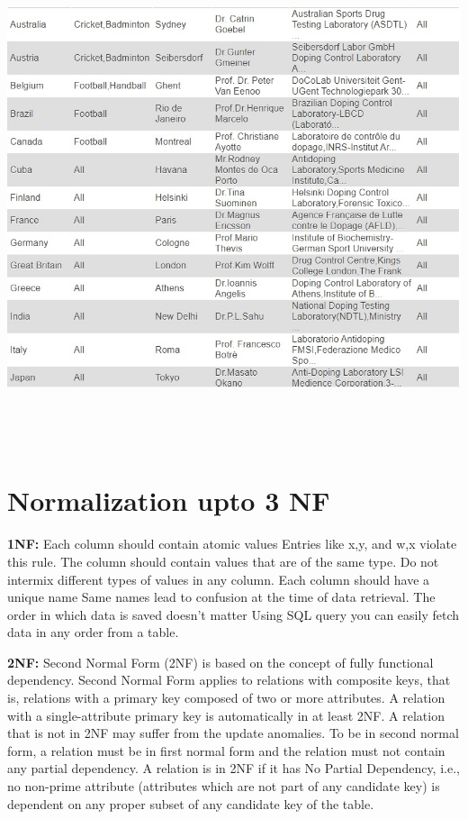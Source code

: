 \documentclass{report}
\begin{document}
\centerline{\includegraphics[width=7in,height=5in,keepaspectratio]{sd5}}\\
\chapter{Normalization upto 3 NF}
\hspace{0.5cm} \textbf{1NF:}
Each column should contain atomic values
     Entries like x,y, and w,x violate this rule.
The column should contain values that are of the same type.
     Do not intermix different types of values in any column.
Each column should have a unique name 
      Same names lead to confusion at the time of data retrieval.
The order in which data is saved doesn’t matter
                 Using SQL query you can easily fetch data in any order from a table.

\textbf{2NF:}
Second Normal Form (2NF) is based on the concept of fully functional dependency. Second Normal Form applies to relations with composite keys, that is, relations with a primary key composed of two or more attributes. A relation with a single-attribute primary key is automatically in at least 2NF. A relation that is not in 2NF may suffer from the update anomalies.
To be in second normal form, a relation must be in first normal form and the relation must not contain any partial dependency. A relation is in 2NF if it has No Partial Dependency, i.e., no non-prime attribute (attributes which are not part of any candidate key) is dependent on any proper subset of any candidate key of the table.
\end{document}
